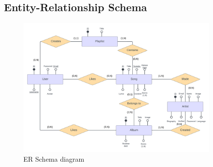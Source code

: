 \subsection{Entity-Relationship Schema}

\begin{figure}[h]
\centering
\includegraphics[width=0.9\textwidth]{sections/DLL/BD_ER_SCHEMA.png}
\caption{ER Schema diagram}
\end{figure}




